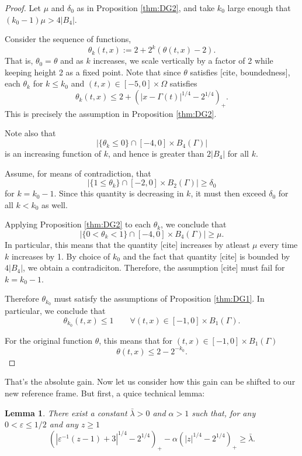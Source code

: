 \documentclass[11pt]{amsart}
\newtheorem{lemma}[theorem]{Lemma}
\theoremstyle{remark}
\theoremstyle{definition}
\newcommand{\eps}{\varepsilon}
\newcommand{\paren}[1]{\left( #1 \right)}
\newcommand{\abs}[1]{\left\lvert #1 \right\rvert}
\newcommand{\n}{^{-1}}
\begin{document}
\begin{proof}
Let $\mu$ and $\delta_0$ as in Proposition \ref{thm:DG2}, and take $k_0$ large enough that $(k_0-1) \mu > 4 |B_4|$.  

Consider the sequence of functions,
\[ \theta_k(t,x) := 2 + 2^k (\theta(t,x) - 2). \]
That is, $\theta_0 = \theta$ and as $k$ increases, we scale vertically by a factor of 2 while keeping height 2 as a fixed point.  Note that since $\theta$ satisfies [cite, boundedness], each $\theta_k$ for $k \leq k_0$ and $(t,x) \in [-5,0] \times \Omega$ satisfies
\[ \theta_k(t,x) \leq 2 + \paren{|x-\Gamma(t)|^{1/4}-2^{1/4}}_+. \]
This is precisely the assumption in Proposition \ref{thm:DG2}.  

Note also that
\[ \abs{\{\theta_k \leq 0\} \cap [-4,0]\times B_4(\Gamma)} \]
is an increasing function of $k$, and hence is greater than $2|B_4|$ for all $k$.  

Assume, for means of contradiction, that
\[ \abs{\{1 \leq \theta_k \} \cap [-2,0]\times B_2(\Gamma)} \geq \delta_0 \]
for $k = k_0-1$.  Since this quantity is decreasing in $k$, it must then exceed $\delta_0$ for all $ k < k_0$ as well.  

Applying Proposition \ref{thm:DG2} to each $\theta_k$, we conclude that 
\[ \abs{\{0 < \theta_k < 1\} \cap [-4,0]\times B_4(\Gamma)} \geq \mu. \]
In particular, this means that the quantity [cite] increases by atleast $\mu$ every time $k$ increases by 1. By choice of $k_0$ and the fact that quantity [cite] is bounded by $4|B_4|$, we obtain a contradiciton.  Therefore, the assumption [cite] must fail for $k = k_0-1$.  

Therefore $\theta_{k_0}$ must satisfy the assumptions of Proposition \ref{thm:DG1}.  In particular, we conclude that
\[ \theta_{k_0}(t,x) \leq 1 \qquad \forall (t,x) \in [-1,0]\times B_1(\Gamma). \]

For the original function $\theta$, this means that for $(t,x) \in [-1,0] \times B_1(\Gamma)$
\[ \theta(t,x) \leq 2 - 2^{-k_0}. \]
\end{proof}

That's the absolute gain.  Now let us consider how this gain can be shifted to our new reference frame.  But first, a quice technical lemma:

\begin{lemma} \label{thm:technical scaling of barrier}
There exist a constant $\bar{\lambda} > 0$ and $\alpha > 1$ such that, for any $0 < \eps \leq 1/2$ and any $z \geq 1$
\[ \paren{|\eps\n (z - 1) + 3|^{1/4} - 2^{1/4}}_+ - \alpha \paren{|z|^{1/4} - 2^{1/4}}_+ \geq \bar{\lambda}. \]
\end{lemma}
\end{document}
